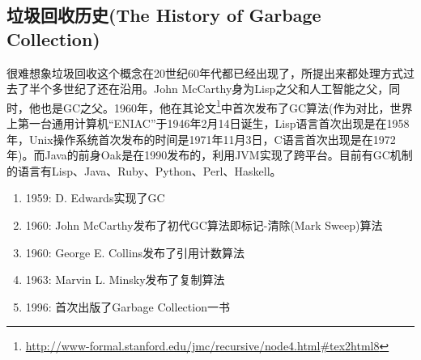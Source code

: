 \documentclass[../../../interview-questions.tex]{subfiles}
\begin{document}
\subsection{垃圾回收历史(The History of Garbage Collection)}

很难想象垃圾回收这个概念在20世纪60年代都已经出现了，所提出来都处理方式过去了半个多世纪了还在沿用。John McCarthy身为Lisp之父和人工智能之父，同时，他也是GC之父。1960年，他在其论文\footnote{\url{http://www-formal.stanford.edu/jmc/recursive/node4.html\#tex2html8}}中首次发布了GC算法(作为对比，世界上第一台通用计算机“ENIAC”于1946年2月14日诞生，Lisp语言首次出现是在1958年，Unix操作系统首次发布的时间是1971年11月3日，C语言首次出现是在1972年)。而Java的前身Oak是在1990发布的，利用JVM实现了跨平台。目前有GC机制的语言有Lisp、Java、Ruby、Python、Perl、Haskell。

\begin{enumerate}
\item{1959: D. Edwards实现了GC} 
\item{1960: John McCarthy发布了初代GC算法即标记-清除(Mark Sweep)算法}
\item{1960: George E. Collins发布了引用计数算法}
\item{1963: Marvin L. Minsky发布了复制算法}
\item{1996: 首次出版了Garbage Collection一书}
\end{enumerate}
\end{document}
